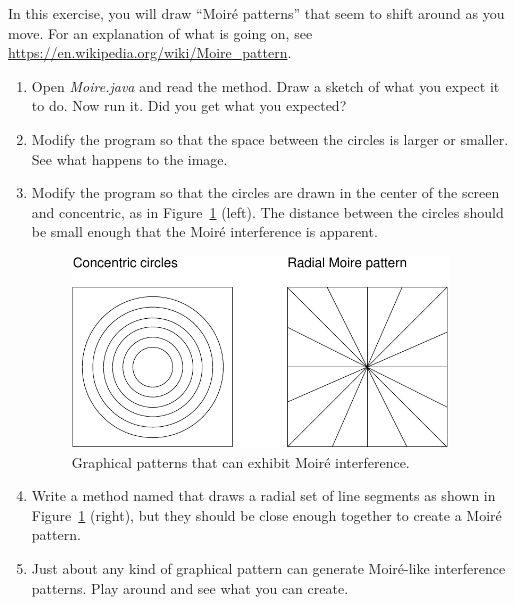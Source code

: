 \begin{exercise}

In this exercise, you will draw ``Moir\'{e} patterns'' that seem to shift around as you move.
For an explanation of what is going on, see \url{https://en.wikipedia.org/wiki/Moire_pattern}.

\begin{enumerate}

\item Open {\it Moire.java} and read the  method.
Draw a sketch of what you expect it to do.
Now run it.
Did you get what you expected?

\item Modify the program so that the space between the circles is larger or smaller.
See what happens to the image.

\item Modify the program so that the circles are drawn in the center of the screen and concentric, as in Figure~\ref{fig.moire} (left).
The distance between the circles should be small enough that the Moir\'{e} interference is apparent.

\begin{figure}[!ht]
\begin{center}
\includegraphics[height=2in]{figs/moire.pdf}
\caption{Graphical patterns that can exhibit Moir\'{e} interference.}
\label{fig.moire}
\end{center}
\end{figure}

\item Write a method named  that draws a radial set of line segments as shown in Figure~\ref{fig.moire} (right), but they should be close enough together to create a Moir\'{e} pattern.

\item Just about any kind of graphical pattern can generate Moir\'{e}-like interference patterns.
Play around and see what you can create.

\end{enumerate}

\end{exercise}
